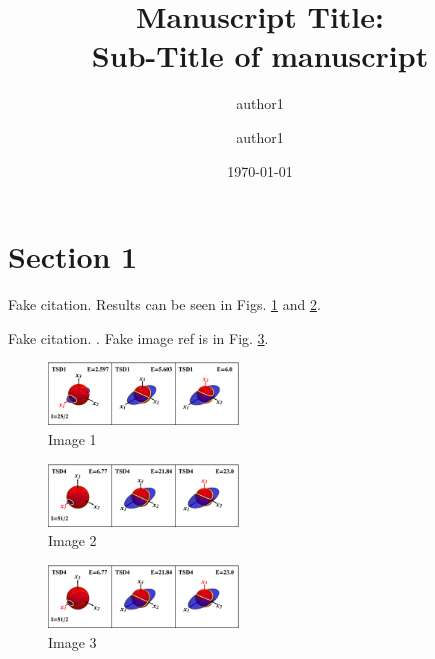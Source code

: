 \documentclass[%
 reprint,
 amsmath,
 amssymb,
 aps,
]{revtex4-2}
\begin{document}
\title{Manuscript Title:\\Sub-Title of manuscript }%

\author{author1}%
\author{author1}%
%


\date{\today}

\begin{abstract}
\lipsum[1]
\end{abstract}

\maketitle


\section{Section 1}

\lipsum[1-2] Fake citation. Results can be seen in Figs. \ref{image1} and \ref{image2}.

\lipsum[1] Fake citation. \cite{chakraborty2020multiphonon}. Fake image ref is in Fig. \ref{image3}.

\begin{figure}
    \centering
    \includegraphics[width=0.45\textwidth]{images/energy_ellipsoids/tsd1_spin1.eps}
    \caption{Image 1}
    \label{image1}
\end{figure}


\begin{figure}
    \centering
    \includegraphics[width=0.45\textwidth]{images/energy_ellipsoids/tsd4_spin2.eps}
    \caption{Image 2}
    \label{image2}
\end{figure}

\begin{figure}
    \centering
    \includegraphics[width=0.45\textwidth]{images/energy_ellipsoids/tsd4_spin2.eps}
    \caption{Image 3}
    \label{image3}
\end{figure}
\end{document}
